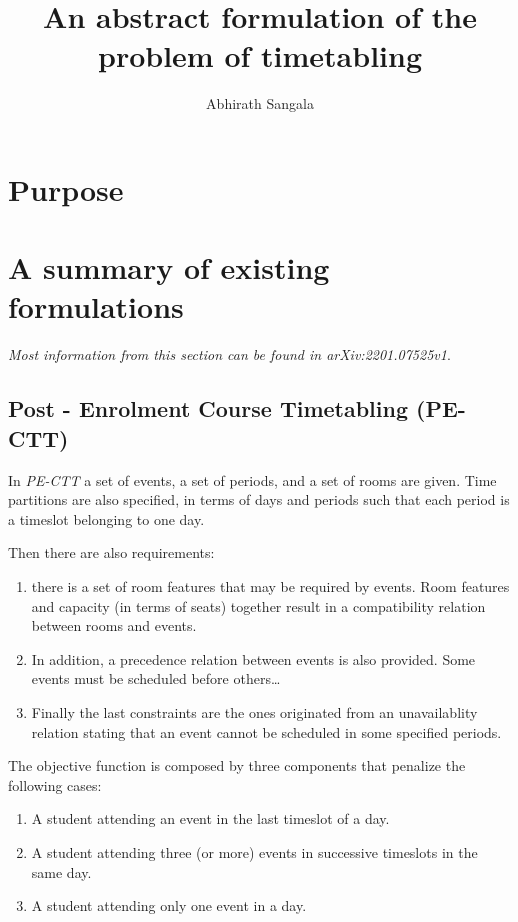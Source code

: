 \documentclass[11pt]{article}
\title{\Huge\textbf{An abstract formulation of the problem of timetabling}}
\author{Abhirath Sangala}
\date{}
\begin{document}
\maketitle


\section*{Purpose}

\section{A summary of existing formulations}

\textit{Most information from this section can be found in arXiv:2201.07525v1}. 

\subsection{Post - Enrolment Course Timetabling (PE-CTT)}
In \textit{PE-CTT} a set of events, a set of periods, and a set of rooms are given. Time partitions are also specified, in terms of days and periods such that each period is a timeslot belonging to one day. 

Then there are also requirements:
\begin{enumerate}
	\item there is a set of room features that may be required by events. Room features and capacity (in terms of seats) together result in a compatibility relation between rooms and events.

	\item In addition, a precedence relation between events is also provided. Some events must be scheduled before others\dots

	\item Finally the last constraints are the ones originated from an unavailablity relation stating that an event cannot be scheduled in some specified periods.
\end{enumerate}

The objective function is composed by three components that penalize the following cases: 
\begin{enumerate}
	\item A student attending an event in the last timeslot of a day. 
	\item A student attending three (or more) events in successive timeslots in the same day. 
	\item A student attending only one event in a day.
\end{enumerate}
\end{document}
